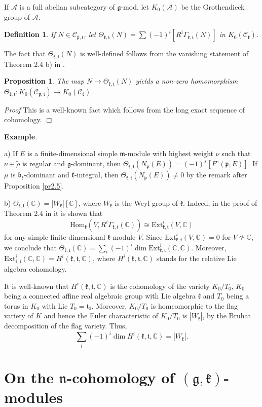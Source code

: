 \documentclass[11pt]{amsart}
\newcounter{theorem}
\newtheorem{prop}[theo]{Proposition}
\renewenvironment{proof}{ \emph{Proof}}{$\Box$}
\newtheorem{defi}{Definition}[section]
\renewcommand{\tt}{\mathfrak{t}}
\newcommand{\kk}{\mathfrak{k}}
\newcommand{\nn}{\mathfrak{n}}
\newcommand{\mm}{\mathfrak{m}}
\newcommand{\pp}{\mathfrak{p}}
\renewcommand{\gg}{\mathfrak{g}}
\newcommand{\bb}{\mathfrak{b}}
\newcommand{\refprop}[1]{Proposition \ref{#1}}
\newcommand{\Hom}{\mathrm{Hom}}
\newcommand{\Ext}{\mathrm{Ext}}
\newcommand{\field}[1]{\mathbb{#1}}
\begin{document}
If $\mathcal{A}$ is a full abelian subcategory of $\gg$-mod, let $K_0(\mathcal{A})$ be the Grothendieck group of $\mathcal{A}$.
\begin{defi}
If $N\in\mathcal{C}_{\bar{\pp},\tt}$, let $\Theta_{\kk,\tt}(N)=\sum (-1)^i[R^{i}\Gamma_{\kk,\tt}(N)]$ in $K_0(\mathcal{C}_{\kk})$.
\end{defi}
The fact that $\Theta_{\kk,\tt}(N)$ is well-defined follows from the vanishing statement of Theorem 2.4 b) in \cite{Z}.
\begin{prop}
The map $N\mapsto\Theta_{\kk,\tt}(N)$ yields a non-zero homomorphism $\Theta_{\kk,\tt}: K_0(\mathcal{C}_{\bar{\pp},\tt})\rightarrow K_0(\mathcal{C}_{\kk})$.
\end{prop}
\begin{proof}
This is a well-known fact which follows from the long exact sequence of cohomology.
\end{proof}

\textbf{Example}.

a) If $E$ is a finite-dimensional simple $\mm$-module with highest weight $\nu$ such that $\nu+\tilde{\rho}$ is regular and $\gg$-dominant, then $\Theta_{\kk,\tt}(N_\pp(E))=(-1)^s[F^s(\pp,E)]$. If $\mu$ is $\bb_\kk$-dominant and $\kk$-integral, then $\Theta_{\kk,\tt}(N_\pp(E))\neq 0$ by the remark after \refprop{pr2.5}.

b) $\Theta_{\kk,\tt}(\field{C})=|W_{\kk}|[\field{C}]$, where $W_{\kk}$ is the Weyl group of $\kk$. Indeed, in the proof of Theorem 2.4 in \cite{Z} it is shown that $$\Hom_\kk(V,R^i\Gamma_{\kk,\tt}(\field{C}))\cong\Ext^i_{\kk,\tt}(V,\field{C})$$ for any simple finite-dimensional $\kk$-module $V$. Since $\Ext^i_{\kk,\tt}(V,\field{C})=0$ for $V\not\simeq\field{C}$, we conclude that $\Theta_{\kk,\tt}(\field{C})=\sum_{i}(-1)^i\dim\Ext^i_{\kk,\tt}(\field{C},\field{C})$. Moreover, $\Ext^i_{\kk,\tt}(\field{C},\field{C})=H^i(\kk,\tt,\field{C})$, where $H^i(\kk,\tt,\field{C})$ stands for the relative Lie algebra cohomology. 

It is well-known that $H^i(\kk,\tt,\field{C})$ is the cohomology of the variety $K_0/T_0$, $K_0$ being a connected affine real algebraic group with Lie algebra $\kk$ and $T_0$ being a torus in $K_0$ with Lie $T_0=\tt_0$. Moreover, $K_0/T_0$ is homeomorphic to the flag variety of $K$ and hence the Euler characteristic of $K_0/T_0$ is $|W_\kk|$, by the Bruhat decomposition of the flag variety. Thus, $$\sum_i(-1)^i\dim H^i(\kk,\tt,\field{C})=|W_\kk|.$$

\section{On the $\nn$-cohomology of $(\gg,\kk)$-modules}
\end{document}
